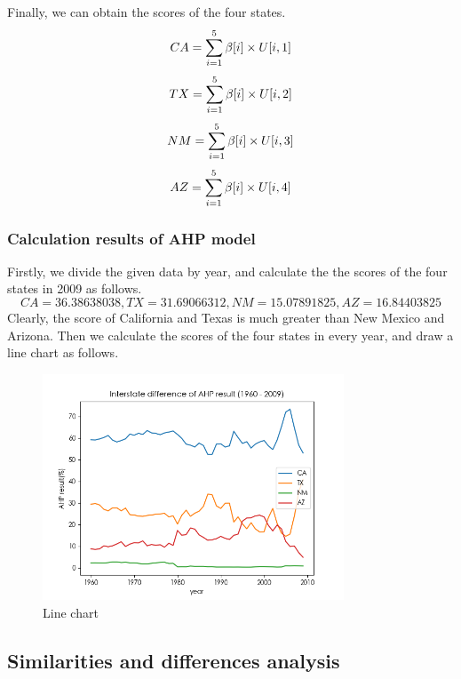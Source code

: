 \documentclass[a4paper,11pt]{article}
\begin{document}
\par Finally, we can obtain the scores of the four states.
\begin{equation}
    \centering
    CA=\sum_{i=1}^{5}\beta[i] \times U[i,1]
\end{equation}
\begin{equation}
    \centering
    TX=\sum_{i=1}^{5}\beta[i] \times U[i,2]
\end{equation}
\begin{equation}
    \centering
    NM=\sum_{i=1}^{5}\beta[i] \times U[i,3]
\end{equation}
\begin{equation}
    \centering
    AZ=\sum_{i=1}^{5}\beta[i] \times U[i,4]
\end{equation}

\subsubsection{Calculation results of AHP model}
\par Firstly, we divide the given data by year, and calculate the the scores of the four states in 2009 as follows.
\[
    CA=36.38638038, TX=31.69066312, NM=15.07891825, AZ=16.84403825
\]
Clearly, the score of California and Texas is much greater than New Mexico and Arizona.
Then we calculate the scores of the four states in every year, and draw a line chart as follows.
\begin{figure}[!hptb] 
    \centering 
    \includegraphics[width=0.8\textwidth]{./Pic/B-level.png}
    \caption{Line chart}
    \label{fig:B-level}
\end{figure}

\subsection{Similarities and differences analysis}
\end{document}
